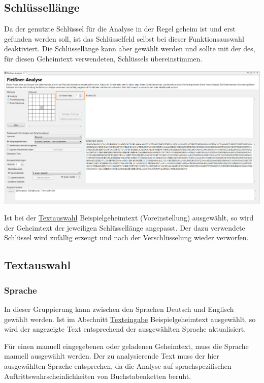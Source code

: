 \documentclass[fontsize=12pt, DIV=15, parskip=half-]{scrartcl}
\theoremstyle{break}
\begin{document}
\subsection{Schlüssellänge}
Da der genutzte Schlüssel für die Analyse in der Regel geheim ist und erst gefunden werden soll, ist das Schlüsselfeld selbst bei dieser Funktionsauswahl deaktiviert. Die Schlüssellänge kann aber gewählt werden und sollte mit der des, für diesen Geheimtext verwendeten, Schlüssels übereinstimmen.

\includegraphics[scale=0.45]{FleissnerKeySize.png}


Ist bei der \hyperlink{txtausw}{Textauswahl}  \glqq Beispielgeheimtext\grqq{} (Voreinstellung) ausgewählt, so wird der Geheimtext der jeweiligen Schlüssellänge angepasst. Der dazu verwendete Schlüssel wird zufällig erzeugt und nach der Verschlüsselung wieder verworfen.

\subsection{Textauswahl} \hypertarget{txtausw}{}
\subsubsection{Sprache}
In dieser Gruppierung kann zwischen den Sprachen \glqq Deutsch\grqq{} und \glqq Englisch\grqq{} gewählt werden. Ist im Abschnitt \hyperlink{txteing}{Texteingabe} \glqq Beispielgeheimtext\grqq{} ausgewählt, so wird der angezeigte Text entsprechend der ausgewählten Sprache aktualisiert. 

Für einen manuell eingegebenen oder geladenen Geheimtext, muss die Sprache manuell ausgewählt werden. Der zu analysierende Text muss der hier ausgewählten Sprache entsprechen, da die Analyse auf sprachspezifischen Auftrittswahrscheinlichkeiten von Buchstabenketten beruht.
\end{document}
